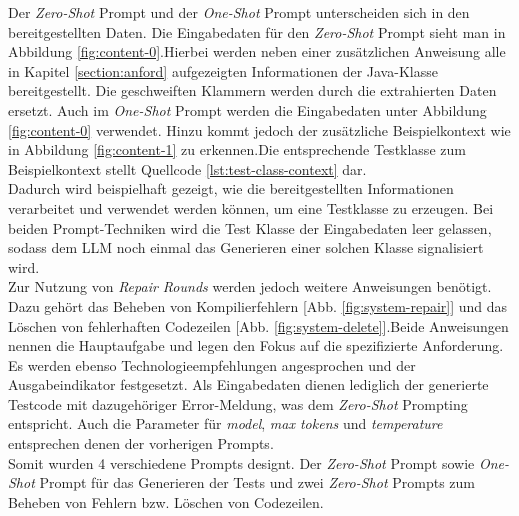 Der \textit{Zero-Shot} Prompt und der \textit{One-Shot} Prompt unterscheiden sich in den bereitgestellten Daten. Die Eingabedaten für den \textit{Zero-Shot} Prompt sieht man in Abbildung \ref{fig:content-0}.Hierbei werden neben einer zusätzlichen Anweisung alle in Kapitel \ref{section:anford} aufgezeigten Informationen der Java-Klasse bereitgestellt. Die geschweiften Klammern werden durch die extrahierten Daten ersetzt. Auch im \textit{One-Shot} Prompt werden die Eingabedaten unter Abbildung \ref{fig:content-0} verwendet. Hinzu kommt jedoch der zusätzliche Beispielkontext wie in Abbildung \ref{fig:content-1} zu erkennen.Die entsprechende Testklasse zum Beispielkontext stellt Quellcode \ref{lst:test-class-context} dar.\\
\vspace{-.3cm} Dadurch wird beispielhaft gezeigt, wie die bereitgestellten Informationen verarbeitet und verwendet werden können, um eine Testklasse zu erzeugen. Bei beiden Prompt-Techniken wird die Test Klasse der Eingabedaten leer gelassen, sodass dem LLM noch einmal das Generieren einer solchen Klasse signalisiert wird.\\
Zur Nutzung von \textit{Repair Rounds} werden jedoch weitere Anweisungen benötigt. Dazu gehört das Beheben von Kompilierfehlern [Abb. \ref{fig:system-repair}] und das Löschen von fehlerhaften Codezeilen [Abb. \ref{fig:system-delete}].Beide Anweisungen nennen die Hauptaufgabe und legen den Fokus auf die spezifizierte Anforderung. Es werden ebenso Technologieempfehlungen angesprochen und der Ausgabeindikator festgesetzt. Als Eingabedaten dienen lediglich der generierte Testcode mit dazugehöriger Error-Meldung, was dem \textit{Zero-Shot} Prompting entspricht. Auch die Parameter für \textit{model}, \textit{max tokens} und \textit{temperature} entsprechen denen der vorherigen Prompts.\\
Somit wurden 4 verschiedene Prompts designt. Der \textit{Zero-Shot} Prompt sowie \textit{One-Shot} Prompt für das Generieren der Tests und zwei \textit{Zero-Shot} Prompts zum Beheben von Fehlern bzw. Löschen von Codezeilen. 

